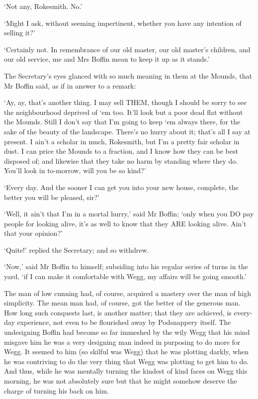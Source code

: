 ‘Not any, Rokesmith. No.’

‘Might I ask, without seeming impertinent, whether you have any
intention of selling it?’

‘Certainly not. In remembrance of our old master, our old master’s
children, and our old service, me and Mrs Boffin mean to keep it up as
it stands.’

The Secretary’s eyes glanced with so much meaning in them at the Mounds,
that Mr Boffin said, as if in answer to a remark:

‘Ay, ay, that’s another thing. I may sell THEM, though I should be sorry
to see the neighbourhood deprived of ‘em too. It’ll look but a poor dead
flat without the Mounds. Still I don’t say that I’m going to keep ‘em
always there, for the sake of the beauty of the landscape. There’s no
hurry about it; that’s all I say at present. I ain’t a scholar in much,
Rokesmith, but I’m a pretty fair scholar in dust. I can price the Mounds
to a fraction, and I know how they can be best disposed of; and likewise
that they take no harm by standing where they do. You’ll look in
to-morrow, will you be so kind?’

‘Every day. And the sooner I can get you into your new house, complete,
the better you will be pleased, sir?’

‘Well, it ain’t that I’m in a mortal hurry,’ said Mr Boffin; ‘only when
you DO pay people for looking alive, it’s as well to know that they ARE
looking alive. Ain’t that your opinion?’

‘Quite!’ replied the Secretary; and so withdrew.

‘Now,’ said Mr Boffin to himself; subsiding into his regular series of
turns in the yard, ‘if I can make it comfortable with Wegg, my affairs
will be going smooth.’

The man of low cunning had, of course, acquired a mastery over the man
of high simplicity. The mean man had, of course, got the better of the
generous man. How long such conquests last, is another matter; that they
are achieved, is every-day experience, not even to be flourished away by
Podsnappery itself. The undesigning Boffin had become so far immeshed
by the wily Wegg that his mind misgave him he was a very designing man
indeed in purposing to do more for Wegg. It seemed to him (so skilful
was Wegg) that he was plotting darkly, when he was contriving to do the
very thing that Wegg was plotting to get him to do. And thus, while he
was mentally turning the kindest of kind faces on Wegg this morning, he
was not absolutely sure but that he might somehow deserve the charge of
turning his back on him.

